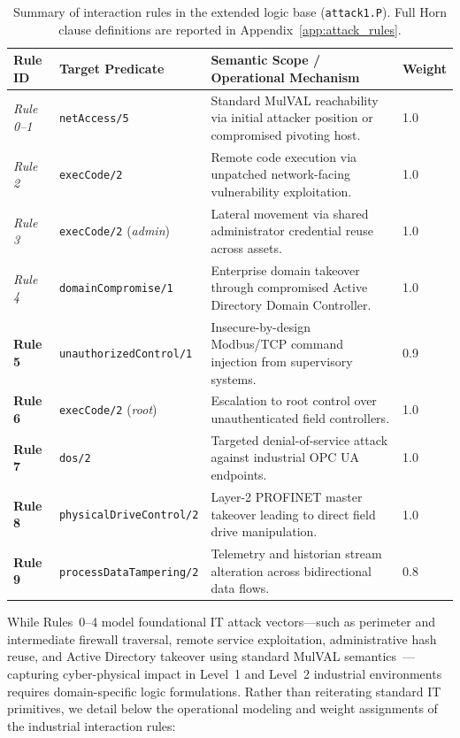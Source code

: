 \documentclass[target=mst,aauheader=aics,style=]{thud}
\begin{document}
\begin{table}[htbp]
\centering
\small
\caption{Summary of interaction rules in the extended logic base (\texttt{attack1.P}). Full Horn clause definitions are reported in Appendix~\ref{app:attack_rules}.}
\label{tab:interaction_rules_summary}
\begin{tabularx}{\textwidth}{L{1.5cm}L{4.2cm}YL{1.2cm}}
\toprule
\textbf{Rule ID} & \textbf{Target Predicate} & \textbf{Semantic Scope / Operational Mechanism} & \textbf{Weight} \\
\midrule
\textit{Rule 0--1} & \texttt{netAccess/5} & Standard MulVAL reachability via initial attacker position or compromised pivoting host. & 1.0 \\
\addlinespace
\textit{Rule 2} & \texttt{execCode/2} & Remote code execution via unpatched network-facing vulnerability exploitation. & 1.0 \\
\addlinespace
\textit{Rule 3} & \texttt{execCode/2} (\textit{admin}) & Lateral movement via shared administrator credential reuse across assets. & 1.0 \\
\addlinespace
\textit{Rule 4} & \texttt{domainCompromise/1} & Enterprise domain takeover through compromised Active Directory Domain Controller. & 1.0 \\
\addlinespace
\textbf{Rule 5} & \texttt{unauthorizedControl/1} & Insecure-by-design Modbus/TCP command injection from supervisory systems. & 0.9 \\
\addlinespace
\textbf{Rule 6} & \texttt{execCode/2} (\textit{root}) & Escalation to root control over unauthenticated field controllers. & 1.0 \\
\addlinespace
\textbf{Rule 7} & \texttt{dos/2} & Targeted denial-of-service attack against industrial OPC UA endpoints. & 1.0 \\
\addlinespace
\textbf{Rule 8} & \texttt{physicalDriveControl/2} & Layer-2 PROFINET master takeover leading to direct field drive manipulation. & 1.0 \\
\addlinespace
\textbf{Rule 9} & \texttt{processDataTampering/2} & Telemetry and historian stream alteration across bidirectional data flows. & 0.8 \\
\bottomrule
\end{tabularx}
\end{table}

While Rules~0--4 model foundational IT attack vectors---such as perimeter and intermediate firewall traversal, remote service exploitation, administrative hash reuse, and Active Directory takeover using standard MulVAL semantics~\cite{Ou05}---capturing cyber-physical impact in Level~1 and Level~2 industrial environments requires domain-specific logic formulations. Rather than reiterating standard IT primitives, we detail below the operational modeling and weight assignments of the industrial interaction rules:
\end{document}
